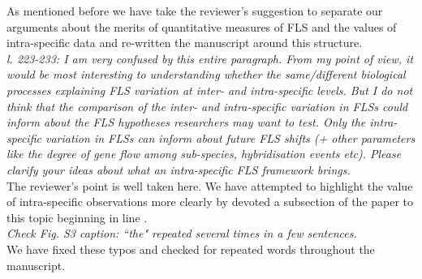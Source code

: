 \documentclass{article}[11pt]
\begin{document}
\noindent As mentioned before we have take the reviewer's suggestion to separate our arguments about the merits of quantitative measures of FLS and the values of intra-specific data and re-written the manuscript around this structure.\\


\emph{l. 223-233: I am very confused by this entire paragraph. From my point of view, it would be most interesting to understanding whether the same/different biological processes explaining FLS variation at inter- and intra-specific levels. But I do not think that the comparison of the inter- and intra-specific variation in FLSs could inform about the FLS hypotheses researchers may want to test. Only the intra-specific variation in FLSs can inform about future FLS shifts (+ other parameters like the degree of gene flow among sub-species, hybridisation events etc). Please clarify your ideas about what an intra-specific FLS framework brings.}\\

\noindent The reviewer's point is well taken here. We have attempted to highlight the value of intra-specific observations more clearly by devoted a subsection of the paper to this topic beginning in line .\\

\emph{Check Fig. S3 caption: ``the" repeated several times in a few sentences.}\\

\noindent We have fixed these typos and checked for repeated words throughout the manuscript.\\

\clearpage


\end{document}
